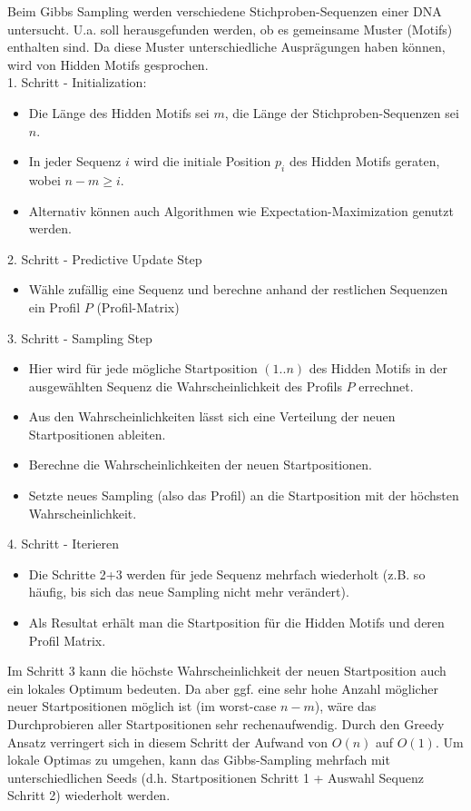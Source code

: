 \documentclass{homework}
\begin{document}
\begin{enumerate}
Beim Gibbs Sampling werden verschiedene Stichproben-Sequenzen einer DNA untersucht. U.a. soll herausgefunden werden, ob es gemeinsame Muster (Motifs) enthalten sind. Da diese Muster unterschiedliche Ausprägungen haben können, wird von Hidden Motifs gesprochen.\\
1. Schritt - Initialization:
\begin{itemize}
	\item Die Länge des Hidden Motifs sei $m$, die Länge der Stichproben-Sequenzen sei $n$.
	\item In jeder Sequenz $i$ wird die initiale Position $p_i$ des Hidden Motifs geraten, wobei $n-m \geq i$.
	\item Alternativ können auch Algorithmen wie Expectation-Maximization genutzt werden.
\end{itemize}
2. Schritt - Predictive Update Step
\begin{itemize}
	\item Wähle zufällig eine Sequenz und berechne anhand der restlichen Sequenzen ein Profil $P$ (Profil-Matrix)
\end{itemize}
3. Schritt - Sampling Step
\begin{itemize}
	\item Hier wird für jede mögliche Startposition $(1..n)$ des Hidden Motifs in der ausgewählten Sequenz die Wahrscheinlichkeit des Profils $P$ errechnet.
	\item Aus den Wahrscheinlichkeiten lässt sich eine Verteilung der neuen Startpositionen ableiten.
	\item Berechne die Wahrscheinlichkeiten der neuen Startpositionen.
	\item Setzte neues Sampling (also das Profil) an die Startposition mit der höchsten Wahrscheinlichkeit.
\end{itemize}
4. Schritt - Iterieren
\begin{itemize}
	\item Die Schritte 2+3 werden für jede Sequenz mehrfach wiederholt (z.B. so häufig, bis sich das neue Sampling nicht mehr verändert).
	\item Als Resultat erhält man die Startposition für die Hidden Motifs und deren Profil Matrix.
\end{itemize}

Im Schritt 3 kann die höchste Wahrscheinlichkeit der neuen Startposition auch ein lokales Optimum bedeuten. Da aber ggf. eine sehr hohe Anzahl möglicher neuer Startpositionen möglich ist (im worst-case $n-m$), wäre das Durchprobieren aller Startpositionen sehr rechenaufwendig. Durch den Greedy Ansatz verringert sich in diesem Schritt der Aufwand von $O(n)$ auf $O(1)$. Um lokale Optimas zu umgehen, kann das Gibbs-Sampling mehrfach mit unterschiedlichen Seeds (d.h. Startpositionen Schritt 1 + Auswahl Sequenz Schritt 2) wiederholt werden. 
\end{enumerate}
\end{document}
